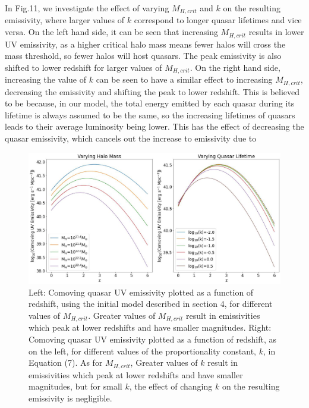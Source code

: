 \documentclass[12pt, twocolumn]{report}%
\begin{document}
In Fig.11, we investigate the effect of varying $M_{H,crit}$ and $k$ on the resulting emissivity, where larger values of $k$ correspond to longer quasar lifetimes and vice versa. On the left hand side, it can be seen that increasing $M_{H,crit}$ results in lower UV emissivity, as a higher critical halo mass means fewer halos will cross the mass threshold, so fewer halos will host quasars. The peak emissivity is also shifted to lower redshift for larger values of $M_{H,crit}$. On the right hand side, increasing the value of $k$ can be seen to have a similar effect to increasing $M_{H,crit}$, decreasing the emissivity and shifting the peak to lower redshift. This is believed to be because, in our model, the total energy emitted by each quasar during its lifetime is always assumed to be the same, so the increasing lifetimes of quasars leads to their average luminosity being lower. This has the effect of decreasing the quasar emissivity, which cancels out the increase to emissivity due to

\onecolumngrid


 \begin{figure}[H]
     \centering
     \includegraphics[width=\linewidth]{Plot_9.jpeg}
     \caption{Left: Comoving quasar UV emissivity plotted as a function of redshift, using the initial model described in section 4, for different values of $M_{H,crit}$. Greater values of $M_{H,crit}$ result in emissivities which peak at lower redshifts and have smaller magnitudes. Right: Comoving quasar UV emissivity plotted as a function of redshift, as on the left, for different values of the proportionality constant, $k$, in Equation (7). As for $M_{H,crit}$, Greater values of $k$ result in emissivities which peak at lower redshifts and have smaller magnitudes, but for small $k$, the effect of changing $k$ on the resulting emissivity is negligible.}
     \label{fig:11}
 \end{figure}
\end{document}
